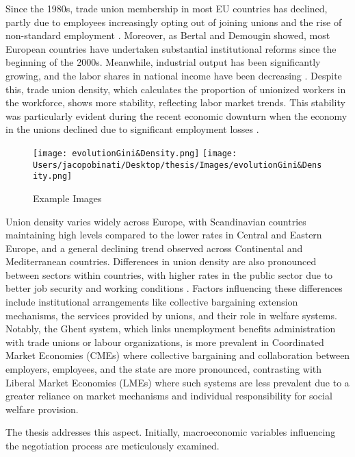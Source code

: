 \documentclass{article}
\begin{document}
Since the 1980s, trade union membership in most EU countries has declined, partly due to employees increasingly opting out of joining unions and the rise of non-standard employment \cite{OnaranGuschanski2018}. Moreover, as Bertal and Demougin showed, most European countries have undertaken substantial institutional reforms since the beginning of the 2000s. Meanwhile, industrial output has been significantly growing, and the labor shares in national income have been decreasing \cite{BentalDemougin2010}. Despite this, trade union density, which calculates the proportion of unionized workers in the workforce, shows more stability, reflecting labor market trends. This stability was particularly evident during the recent economic downturn when the economy in the unions declined due to significant employment losses \cite{OnaranGuschanski2018}.

\begin{figure}[htbp]
    \centering
    \texttt{[image: evolutionGini\&Density.png]}
    \texttt{[image: Users/jacopobinati/Desktop/thesis/Images/evolutionGini\&Density.png]}
    \caption{Example Images}
    \label{fig:example}
\end{figure}


Union density varies widely across Europe, with Scandinavian countries maintaining high levels compared to the lower rates in Central and Eastern Europe, and a general declining trend observed across Continental and Mediterranean countries. Differences in union density are also pronounced between sectors within countries, with higher rates in the public sector due to better job security and working conditions \cite{BentalDemougin2010}. Factors influencing these differences include institutional arrangements like collective bargaining extension mechanisms, the services provided by unions, and their role in welfare systems. Notably, the Ghent system, which links unemployment benefits administration with trade unions or labour organizations, is more prevalent in Coordinated Market Economies (CMEs) where collective bargaining and collaboration between employers, employees, and the state are more pronounced, contrasting with Liberal Market Economies (LMEs) where such systems are less prevalent due to a greater reliance on market mechanisms and individual responsibility for social welfare provision.

The thesis addresses this aspect. Initially, macroeconomic variables influencing the negotiation process are meticulously examined.
\end{document}
